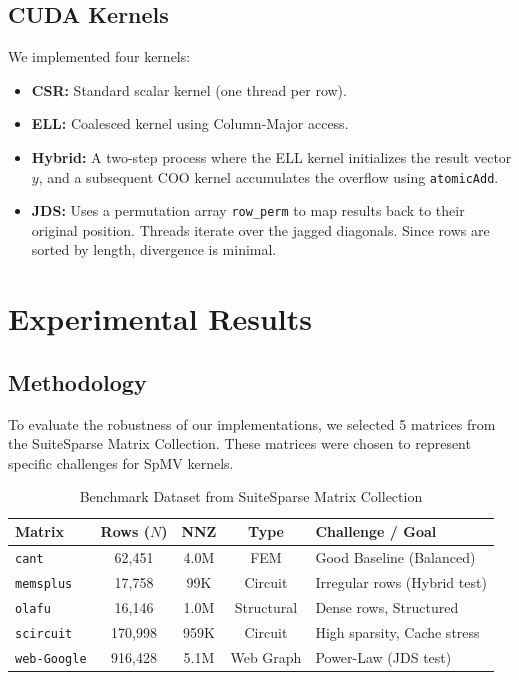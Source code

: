 \documentclass[a4paper,12pt]{article}
\begin{document}
\subsection{CUDA Kernels}
We implemented four kernels:
\begin{itemize}
    \item \textbf{CSR:} Standard scalar kernel (one thread per row).
    \item \textbf{ELL:} Coalesced kernel using Column-Major access.
    \item \textbf{Hybrid:} A two-step process where the ELL kernel initializes the result vector $y$, and a subsequent COO kernel accumulates the overflow using \texttt{atomicAdd}.
    \item \textbf{JDS:} Uses a permutation array \texttt{row\_perm} to map results back to their original position. Threads iterate over the jagged diagonals. Since rows are sorted by length, divergence is minimal.
\end{itemize}


\newpage
\section{Experimental Results}

\subsection{Methodology}
To evaluate the robustness of our implementations, we selected 5 matrices from the SuiteSparse Matrix Collection. These matrices were chosen to represent specific challenges for SpMV kernels.

\begin{table}[h]
    \centering
    \begin{tabular}{lcccl}
    \toprule
    \textbf{Matrix} & \textbf{Rows ($N$)} & \textbf{NNZ} & \textbf{Type} & \textbf{Challenge / Goal} \\
    \midrule
    \texttt{cant} & 62,451 & 4.0M & FEM & Good Baseline (Balanced) \\
    \texttt{memsplus} & 17,758 & 99K & Circuit & Irregular rows (Hybrid test) \\
    \texttt{olafu} & 16,146 & 1.0M & Structural & Dense rows, Structured \\
    \texttt{scircuit} & 170,998 & 959K & Circuit & High sparsity, Cache stress \\
    \texttt{web-Google} & 916,428 & 5.1M & Web Graph & Power-Law (JDS test) \\
    \bottomrule
    \end{tabular}
    \caption{Benchmark Dataset from SuiteSparse Matrix Collection}
    \label{tab:dataset}
\end{table}
\end{document}
